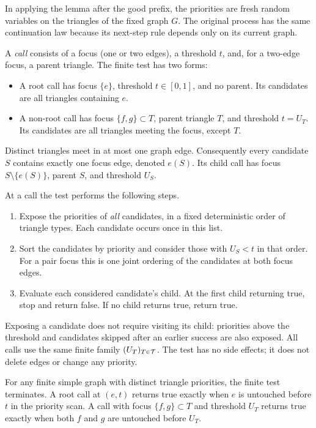 In applying the lemma after the good prefix, the priorities are fresh
random variables on the triangles of the fixed graph $G$.  The original
process has the same continuation law because its next-step rule
depends only on its current graph.

A \emph{call} consists of a focus (one or two edges), a threshold $t$,
and, for a two-edge focus, a parent triangle.  The finite test has two
forms:
\begin{itemize}
\item A root call has focus $\{e\}$, threshold $t\in[0,1]$, and no
parent.  Its candidates are all triangles containing $e$.
\item A non-root call has focus $\{f,g\}\subset T$, parent triangle $T$,
and threshold $t=U_T$.  Its candidates are all triangles meeting the
focus, except $T$.
\end{itemize}
Distinct triangles meet in at most one graph edge.  Consequently every
candidate $S$ contains exactly one focus edge, denoted $e(S)$.  Its child
call has focus $S\setminus\{e(S)\}$, parent $S$, and threshold $U_S$.

At a call the test performs the following steps.
\begin{enumerate}
\item Expose the priorities of \emph{all} candidates, in a fixed
deterministic order of triangle types.  Each candidate occurs once in
this list.
\item Sort the candidates by priority and consider those with $U_S<t$
in that order.  For a pair focus this is one joint ordering of the
candidates at both focus edges.
\item Evaluate each considered candidate's child.  At the first child
returning true, stop and return false.  If no child returns true, return
true.
\end{enumerate}
Exposing a candidate does not require visiting its child: priorities
above the threshold and candidates skipped after an earlier success
are also exposed.  All calls use the same finite family $(U_T)_{T\in\mathcal T}$.
The test has no side effects; it does not delete edges or change any
priority.

\begin{lemma}\label{lem:finite-test}
For any finite simple graph with distinct triangle priorities, the
finite test terminates.  A root call at $(e,t)$ returns true exactly when
$e$ is untouched before $t$ in the priority scan.  A call with focus
$\{f,g\}\subset T$ and threshold $U_T$ returns true exactly when both
$f$ and $g$ are untouched before $U_T$.
\end{lemma}

